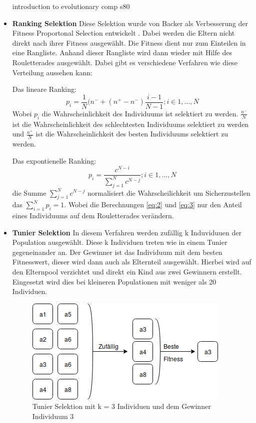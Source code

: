 \begin{itemize}
introduction to evolutionary comp s80

\item \textbf{Ranking Selektion} Diese Selektion wurde von Backer als Verbesserung der Fitness Proportonal Selection entwickelt \cite{baker1985adaptive}. Dabei werden die Eltern nicht direkt nach ihrer Fitness ausgewählt. Die Fitness dient nur zum Einteilen in eine Rangliste. Anhand dieser Rangliste wird dann wieder mit Hilfe des Rouletterades ausgewählt. Dabei gibt es verschiedene Verfahren wie diese Verteilung aussehen kann:

Das lineare Ranking:
\begin{equation}	
	p_i = \frac{1}{N}(n^- + (n^+ - n^- ) \frac{i-1}{N-1}; i\in{1,...,N} \label{eq:2}
\end{equation}
Wobei $p_i$ die Wahrscheinlichkeit des Individuums ist selektiert zu werden. $\frac{n^-}{N}$ ist die Wahrscheinlichkeit des schlechtesten Individuums selektiert zu werden und  $\frac{n^+}{N}$ ist die Wahrscheinlichkeit des besten Individuums selektiert zu werden.

Das expontienelle Ranking:
\begin{equation}
	p_i = \frac{c^{N-i}}{\sum_{j=1}^N c^{N-j}}; i\in{1,...,N} \label{eq:3}
\end{equation}
die Summe $\sum_{j=1}^N c^{N-j}$ normalisiert die Wahrscheilichkeit um Sicherzustellen das $\sum_{i=1}^N p_i = 1$.
Wobei die Berechnungen \ref{eq:2} und \ref{eq:3} nur den Anteil eines Individuums auf dem Rouletterades verändern.

\item \textbf{Tunier Selektion} In diesem Verfahren werden zufällig k Induviduuen der Population ausgewählt. Diese k Individuen treten wie in einem Tunier gegeneinander an. Der Gewinner ist das Individuum mit dem besten Fitnesswert, dieser wird dann auch als Elternteil ausgewählt. Hierbei wird auf den Elternpool verzichtet und direkt ein Kind aus zwei Gewinnern erstellt. Eingesetzt wird dies bei kleineren Populationen mit weniger als 20 Individuen.

\begin{figure}[htb]
  \centering  
  \includegraphics[scale=0.7]{img/tunier.png}
  \caption{Tunier Selektion mit k = 3 Individuen und dem Gewinner Individuum 3}
  \label{fig:roulette_wheel}
\end{figure}


\end{itemize}


